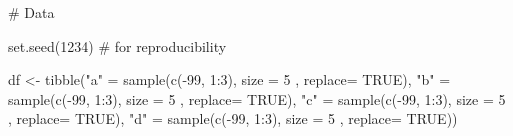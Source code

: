 \documentclass[
  letterpaper,
  DIV=11,
  numbers=noendperiod]{scrreprt}
\newenvironment{Shaded}{\begin{snugshade}}{\end{snugshade}}
\newcommand{\AttributeTok}[1]{\textcolor[rgb]{0.40,0.45,0.13}{#1}}
\newcommand{\CommentTok}[1]{\textcolor[rgb]{0.37,0.37,0.37}{#1}}
\newcommand{\ConstantTok}[1]{\textcolor[rgb]{0.56,0.35,0.01}{#1}}
\newcommand{\DecValTok}[1]{\textcolor[rgb]{0.68,0.00,0.00}{#1}}
\newcommand{\FunctionTok}[1]{\textcolor[rgb]{0.28,0.35,0.67}{#1}}
\newcommand{\NormalTok}[1]{\textcolor[rgb]{0.00,0.23,0.31}{#1}}
\newcommand{\OtherTok}[1]{\textcolor[rgb]{0.00,0.23,0.31}{#1}}
\newcommand{\SpecialCharTok}[1]{\textcolor[rgb]{0.37,0.37,0.37}{#1}}
\newcommand{\StringTok}[1]{\textcolor[rgb]{0.13,0.47,0.30}{#1}}
\begin{document}
\begin{Shaded}
\begin{Highlighting}[]
\CommentTok{\# Data}

\FunctionTok{set.seed}\NormalTok{(}\DecValTok{1234}\NormalTok{) }\CommentTok{\# for reproducibility }

\NormalTok{df }\OtherTok{\textless{}{-}} \FunctionTok{tibble}\NormalTok{(}\StringTok{"a"} \OtherTok{=} \FunctionTok{sample}\NormalTok{(}\FunctionTok{c}\NormalTok{(}\SpecialCharTok{{-}}\DecValTok{99}\NormalTok{, }\DecValTok{1}\SpecialCharTok{:}\DecValTok{3}\NormalTok{), }\AttributeTok{size =} \DecValTok{5}\NormalTok{ , }\AttributeTok{replace=} \ConstantTok{TRUE}\NormalTok{),}
             \StringTok{"b"} \OtherTok{=} \FunctionTok{sample}\NormalTok{(}\FunctionTok{c}\NormalTok{(}\SpecialCharTok{{-}}\DecValTok{99}\NormalTok{, }\DecValTok{1}\SpecialCharTok{:}\DecValTok{3}\NormalTok{), }\AttributeTok{size =} \DecValTok{5}\NormalTok{ , }\AttributeTok{replace=} \ConstantTok{TRUE}\NormalTok{),}
             \StringTok{"c"} \OtherTok{=} \FunctionTok{sample}\NormalTok{(}\FunctionTok{c}\NormalTok{(}\SpecialCharTok{{-}}\DecValTok{99}\NormalTok{, }\DecValTok{1}\SpecialCharTok{:}\DecValTok{3}\NormalTok{), }\AttributeTok{size =} \DecValTok{5}\NormalTok{ , }\AttributeTok{replace=} \ConstantTok{TRUE}\NormalTok{),}
             \StringTok{"d"} \OtherTok{=} \FunctionTok{sample}\NormalTok{(}\FunctionTok{c}\NormalTok{(}\SpecialCharTok{{-}}\DecValTok{99}\NormalTok{, }\DecValTok{1}\SpecialCharTok{:}\DecValTok{3}\NormalTok{), }\AttributeTok{size =} \DecValTok{5}\NormalTok{ , }\AttributeTok{replace=} \ConstantTok{TRUE}\NormalTok{))}
\end{Highlighting}
\end{Shaded}

\begin{Shaded}
\end{Shaded}
\end{document}
